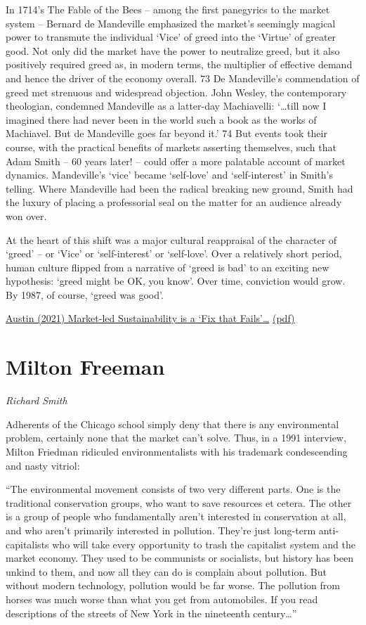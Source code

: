 \documentclass[
]{book}
\begin{document}
In 1714's The Fable of the Bees -- among the first panegyrics to the market system -- Bernard de
Mandeville emphasized the market's seemingly magical power to transmute the individual `Vice' of
greed into the `Virtue' of greater good. Not only did the market have the power to neutralize greed,
but it also positively required greed as, in modern terms, the multiplier of effective demand and
hence the driver of the economy overall. 73
De Mandeville's commendation of greed met strenuous and widespread objection. John Wesley, the
contemporary theologian, condemned Mandeville as a latter-day Machiavelli:
`\ldots till now I imagined there had never been in the world such a book as the works of
Machiavel. But de Mandeville goes far beyond it.' 74
But events took their course, with the practical benefits of markets asserting themselves, such that
Adam Smith -- 60 years later! -- could offer a more palatable account of market dynamics.
Mandeville's `vice' became `self-love' and `self-interest' in Smith's telling. Where Mandeville had
been the radical breaking new ground, Smith had the luxury of placing a professorial seal on the
matter for an audience already won over.

At the heart of this shift was a major cultural reappraisal of the character of `greed' -- or `Vice' or
`self-interest' or `self-love'. Over a relatively short period, human culture flipped from a narrative of
`greed is bad' to an exciting new hypothesis: `greed might be OK, you know'. Over time, conviction
would grow. By 1987, of course, `greed was good'.

\href{https://bothbrainsrequire\%20d.com/2021/10/25/fix-that-fails/}{Austin (2021) Market-led Sustainability is a `Fix that Fails'\ldots{}}
\href{pdf/Austin_2021_Market_Led_Sustainability_Fix_Fails.pdf}{(pdf)}

\hypertarget{milton-freeman}{%
\section{Milton Freeman}\label{milton-freeman}}

\emph{Richard Smith}

Adherents of the Chicago school simply deny
that there is any environmental problem, certainly none that the market can't solve.
Thus, in a 1991 interview, Milton Friedman ridiculed environmentalists with his
trademark condescending and nasty vitriol:

``The environmental movement consists of two very different
parts. One is the traditional conservation groups, who want to save
resources et cetera. The other is a group of people who
fundamentally aren't interested in conservation at all, and who
aren't primarily interested in pollution. They're just long-term
anti-capitalists who will take every opportunity to trash the
capitalist system and the market economy. They used to be
communists or socialists, but history has been unkind to them, and
now all they can do is complain about pollution. But without
modern technology, pollution would be far worse. The pollution
from horses was much worse than what you get from automobiles.
If you read descriptions of the streets of New York in the
nineteenth century\ldots{}''
\end{document}
